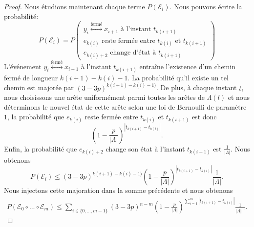 \documentclass[titlepage,a4paper,12pt]{article}
\newcounter{d}
\newcounter{t}
\newcounter{p}
\newcounter{c}
\newcounter{a}
\newcounter{l}
\begin{document}
\begin{proof}
Nous étudions maintenant chaque terme $P(\mathcal{E}_i)$. Nous pouvons écrire la probabilité:
$$
P(\mathcal{E}_i) = P\left(\begin{array}{c}
y_i\overset{\text{fermé}}{\longleftrightarrow} x_{i+1}\text{ à l'instant }t_{k(i+1)}\\
e_{k(i)} \text{ reste fermée entre } t_{k(i)} \text{ et } t_{k(i+1)}\\
e_{k(i)+2} \text{ change d'état à }t_{k(i+1)}
\end{array}\right)
$$
L'événement $y_i\overset{\text{fermé}}{\longleftrightarrow} x_{i+1}$ à l'instant $t_{k(i+1)}$ entraîne l'existence d'un chemin fermé de longueur $k(i+1)-k(i)-1$. La probabilité qu'il existe un tel chemin est majorée par $(3-3p)^{k(i+1)-k(i)-1)}$.
De plus, à chaque instant $t$, nous choisissons une arête uniformément parmi toutes les arêtes de $\Lambda(l)$ et nous déterminons le nouvel état de cette arête selon une loi de Bernoulli  de paramètre $1$, la probabilité que $e_{k(i)}$ reste fermée entre $t_{k(i)}$ et $t_{k(i+1)}$ est donc $$\left(1-\frac{p}{|\Lambda|}\right)^{|t_{k(i+1)}-t_{k(i)}|}.$$ Enfin, la probabilité que $e_{k(i)+2}$ change son état à l'instant $t_{k(i+1)}$ est $\frac{1}{|\Lambda|}$. Nous obtenons
$$P(\mathcal{E}_i)\leqslant (3-3p)^{k(i+1)-k(i)-1)}\left(1-\frac{p}{|\Lambda|}\right)^{|t_{k(i+1)}-t_{k(i)}|}\frac{1}{|\Lambda|}.$$
Nous injectons cette majoration dans la somme précédente et nous obtenons
\begin{multline*}
P(\mathcal{E}_0\circ\dots\circ \mathcal{E}_m) \leqslant \sum_{i\in \{0,\dots,m-1\}}(3-3p)^{n-m}\left(1-\frac{p}{|\Lambda|}\right)^{\displaystyle \sum_{i=1}^{m}|t_{k(i+1)}-t_{k(i)}|}\frac{1}{|\Lambda|^m}.
\end{multline*}


\end{proof}
\end{document}

